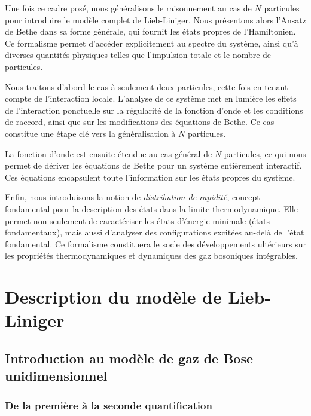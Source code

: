 \medskip

Une fois ce cadre posé, nous généralisons le raisonnement au cas de \(N\) particules pour introduire le modèle complet de Lieb-Liniger. Nous présentons alors l’Ansatz de Bethe dans sa forme générale, qui fournit les états propres de l’Hamiltonien. Ce formalisme permet d’accéder explicitement au spectre du système, ainsi qu’à diverses quantités physiques telles que l’impulsion totale et le nombre de particules.

\medskip

Nous traitons d'abord le cas à seulement deux particules, cette fois en tenant compte de l’interaction locale. L’analyse de ce système met en lumière les effets de l’interaction ponctuelle sur la régularité de la fonction d’onde et les conditions de raccord, ainsi que sur les modifications des équations de Bethe. Ce cas constitue une étape clé vers la généralisation à \(N\) particules.

\medskip

La fonction d’onde est ensuite étendue au cas général de \(N\) particules, ce qui nous permet de dériver les équations de Bethe pour un système entièrement interactif. Ces équations encapsulent toute l’information sur les états propres du système.

\medskip

Enfin, nous introduisons la notion de \emph{distribution de rapidité}, concept fondamental pour la description des états dans la limite thermodynamique. Elle permet non seulement de caractériser les états d’énergie minimale (états fondamentaux), mais aussi d’analyser des configurations excitées au-delà de l’état fondamental. Ce formalisme constituera le socle des développements ultérieurs sur les propriétés thermodynamiques et dynamiques des gaz bosoniques intégrables.


\section{Description du modèle de Lieb-Liniger}

\subsection{Introduction au modèle de gaz de Bose unidimensionnel}%

\subsubsection{De la première à la seconde quantification}

